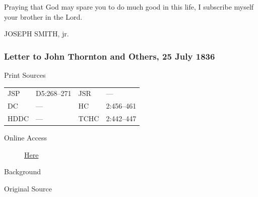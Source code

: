 					Praying that God may spare you to do much good in this life, I subscribe myself your brother in the Lord.

					\begin{tightright}
					JOSEPH SMITH, jr.
					\end{tightright}
					
		\subsubsection{Letter to John Thornton and Others, 25 July 1836}
			\label{EMS-1836-JS-25-JUL-1836}
			
			\begin{description}
					\item[Print Sources]
				\end{description}

					\begin{tabular}{p{0.5in}p{1in}p{0.5in}p{1in}}
					JSP	 	& D5:268--271		& JSR 		& --- \\
					DC	 	& ---				& HC 		& 2:456--461 \\
					HDDC 	& ---				& TCHC 		& 2:442--447 \\
					\end{tabular}
				
				\begin{description}
					\item[Online Access] \href{https://www.josephsmithpapers.org/paper-summary/letter-to-john-thornton-and-others-25-july-1836/1}{Here}
				\end{description}
				
				\begin{description}
					\item[Background]
				\end{description}
				
				
				\begin{description}
					\item[Original Source]
				\end{description}
				
